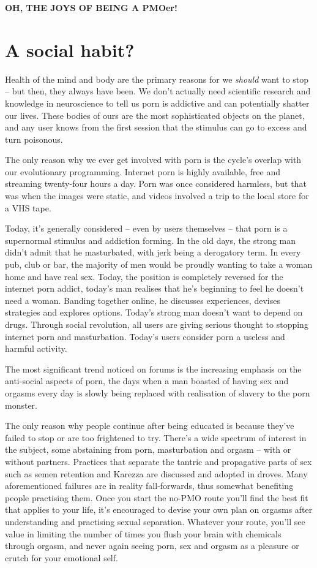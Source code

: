 \documentclass[
]{book}
\begin{document}
\textbf{OH, THE JOYS OF BEING A PMOer!}

\hypertarget{a-social-habit}{%
\chapter{A social habit?}\label{a-social-habit}}

Health of the mind and body are the primary reasons for we \emph{should} want to stop -- but then, they always have been. We don't actually need scientific research and knowledge in neuroscience to tell us porn is addictive and can potentially shatter our lives. These bodies of ours are the most sophisticated objects on the planet, and any user knows from the first session that the stimulus can go to excess and turn poisonous.

The only reason why we ever get involved with porn is the cycle's overlap with our evolutionary programming. Internet porn is highly available, free and streaming twenty-four hours a day. Porn was once considered harmless, but that was when the images were static, and videos involved a trip to the local store for a VHS tape.

Today, it's generally considered -- even by users themselves -- that porn is a supernormal stimulus and addiction forming. In the old days, the strong man didn't admit that he masturbated, with jerk being a derogatory term. In every pub, club or bar, the majority of men would be proudly wanting to take a woman home and have real sex. Today, the position is completely reversed for the internet porn addict, today's man realises that he's beginning to feel he doesn't need a woman. Banding together online, he discusses experiences, devises strategies and explores options. Today's strong man doesn't want to depend on drugs. Through social revolution, all users are giving serious thought to stopping internet porn and masturbation. Today's users consider porn a useless and harmful activity.

The most significant trend noticed on forums is the increasing emphasis on the anti-social aspects of porn, the days when a man boasted of having sex and orgasms every day is slowly being replaced with realisation of slavery to the porn monster.

The only reason why people continue after being educated is because they've failed to stop or are too frightened to try. There's a wide spectrum of interest in the subject, some abstaining from porn, masturbation and orgasm -- with or without partners. Practices that separate the tantric and propagative parts of sex such as semen retention and Karezza are discussed and adopted in droves. Many aforementioned failures are in reality fall-forwards, thus somewhat benefiting people practising them. Once you start the no-PMO route you'll find the best fit that applies to your life, it's encouraged to devise your own plan on orgasms after understanding and practising sexual separation. Whatever your route, you'll see value in limiting the number of times you flush your brain with chemicals through orgasm, and never again seeing porn, sex and orgasm as a pleasure or crutch for your emotional self.
\end{document}
